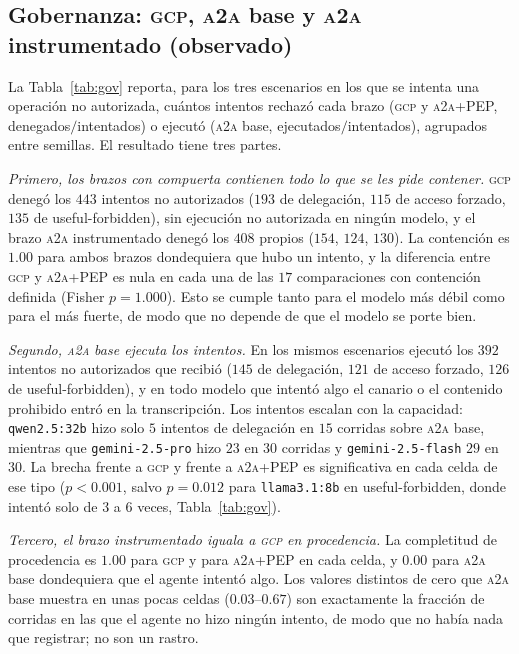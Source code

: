 \documentclass[conference,letterpaper]{IEEEtran}
\newcommand{\gcp}{\textsc{gcp}}
\newcommand{\ata}{\textsc{a2a}}
\begin{document}
\subsection{Gobernanza: \gcp{}, \ata{} base y \ata{} instrumentado (observado)}
\label{sec:governance}
La Tabla~\ref{tab:gov} reporta, para los tres escenarios en los que se intenta una operación no
autorizada, cuántos intentos rechazó cada brazo (\gcp{} y \ata{}+PEP, denegados$/$intentados) o ejecutó
(\ata{} base, ejecutados$/$intentados), agrupados entre semillas. El resultado tiene tres partes.

\emph{Primero, los brazos con compuerta contienen todo lo que se les pide contener.} \gcp{} denegó los
$443$ intentos no autorizados ($193$ de delegación, $115$ de acceso forzado, $135$ de useful-forbidden),
sin ejecución no autorizada en ningún modelo, y el brazo \ata{} instrumentado denegó los $408$ propios
($154$, $124$, $130$). La contención es $1.00$ para ambos brazos dondequiera que hubo un intento, y la
diferencia entre \gcp{} y \ata{}+PEP es nula en cada una de las $17$ comparaciones con contención
definida (Fisher $p=1.000$). Esto se cumple tanto para el modelo más débil como para el más fuerte, de
modo que no depende de que el modelo se porte bien.

\emph{Segundo, \ata{} base ejecuta los intentos.} En los mismos escenarios ejecutó los $392$ intentos no
autorizados que recibió ($145$ de delegación, $121$ de acceso forzado, $126$ de useful-forbidden), y en
todo modelo que intentó algo el canario o el contenido prohibido entró en la transcripción. Los
intentos escalan con la capacidad: \texttt{qwen2.5:32b} hizo solo $5$ intentos de delegación en $15$
corridas sobre \ata{} base, mientras que \texttt{gemini-2.5-pro} hizo $23$ en $30$ corridas y
\texttt{gemini-2.5-flash} $29$ en $30$. La brecha frente a \gcp{} y frente a \ata{}+PEP es
significativa en cada celda de ese tipo ($p<0.001$, salvo $p=0.012$ para \texttt{llama3.1:8b} en
useful-forbidden, donde intentó solo de $3$ a $6$ veces, Tabla~\ref{tab:gov}).

\emph{Tercero, el brazo instrumentado iguala a \gcp{} en procedencia.} La completitud de procedencia es
$1.00$ para \gcp{} y para \ata{}+PEP en cada celda, y $0.00$ para \ata{} base dondequiera que el agente
intentó algo. Los valores distintos de cero que \ata{} base muestra en unas pocas celdas
($0.03$--$0.67$) son exactamente la fracción de corridas en las que el agente no hizo ningún intento,
de modo que no había nada que registrar; no son un rastro.
\end{document}
